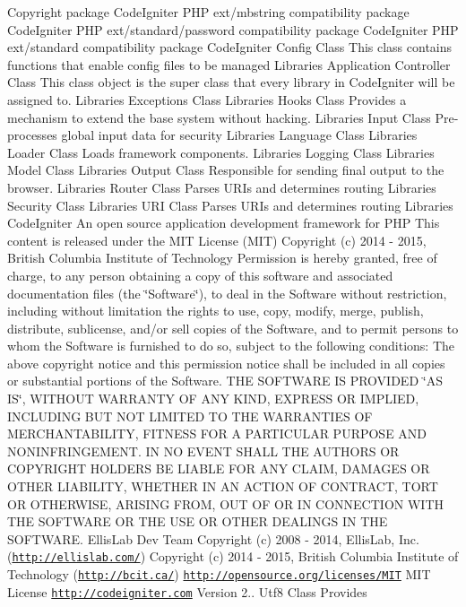 \begin{DoxyCopyright}{Copyright}
package  Code\+Igniter P\+H\+P ext/mbstring compatibility package  Code\+Igniter P\+H\+P ext/standard/password compatibility package  Code\+Igniter P\+H\+P ext/standard compatibility package  Code\+Igniter Config Class This class contains functions that enable config files to be managed  Libraries Application Controller Class This class object is the super class that every library in Code\+Igniter will be assigned to.  Libraries Exceptions Class  Libraries Hooks Class Provides a mechanism to extend the base system without hacking.  Libraries Input Class Pre-\/processes global input data for security  Libraries Language Class  Libraries Loader Class Loads framework components.  Libraries Logging Class  Libraries Model Class  Libraries Output Class Responsible for sending final output to the browser.  Libraries Router Class Parses U\+R\+Is and determines routing  Libraries Security Class  Libraries U\+R\+I Class Parses U\+R\+Is and determines routing  Libraries Code\+Igniter An open source application development framework for P\+H\+P This content is released under the M\+I\+T License (M\+I\+T) Copyright (c) 2014 -\/ 2015, British Columbia Institute of Technology Permission is hereby granted, free of charge, to any person obtaining a copy of this software and associated documentation files (the \char`\"{}\+Software\char`\"{}), to deal in the Software without restriction, including without limitation the rights to use, copy, modify, merge, publish, distribute, sublicense, and/or sell copies of the Software, and to permit persons to whom the Software is furnished to do so, subject to the following conditions\+: The above copyright notice and this permission notice shall be included in all copies or substantial portions of the Software. T\+H\+E S\+O\+F\+T\+W\+A\+R\+E I\+S P\+R\+O\+V\+I\+D\+E\+D \char`\"{}\+A\+S I\+S\char`\"{}, W\+I\+T\+H\+O\+U\+T W\+A\+R\+R\+A\+N\+T\+Y O\+F A\+N\+Y K\+I\+N\+D, E\+X\+P\+R\+E\+S\+S O\+R I\+M\+P\+L\+I\+E\+D, I\+N\+C\+L\+U\+D\+I\+N\+G B\+U\+T N\+O\+T L\+I\+M\+I\+T\+E\+D T\+O T\+H\+E W\+A\+R\+R\+A\+N\+T\+I\+E\+S O\+F M\+E\+R\+C\+H\+A\+N\+T\+A\+B\+I\+L\+I\+T\+Y, F\+I\+T\+N\+E\+S\+S F\+O\+R A P\+A\+R\+T\+I\+C\+U\+L\+A\+R P\+U\+R\+P\+O\+S\+E A\+N\+D N\+O\+N\+I\+N\+F\+R\+I\+N\+G\+E\+M\+E\+N\+T. I\+N N\+O E\+V\+E\+N\+T S\+H\+A\+L\+L T\+H\+E A\+U\+T\+H\+O\+R\+S O\+R C\+O\+P\+Y\+R\+I\+G\+H\+T H\+O\+L\+D\+E\+R\+S B\+E L\+I\+A\+B\+L\+E F\+O\+R A\+N\+Y C\+L\+A\+I\+M, D\+A\+M\+A\+G\+E\+S O\+R O\+T\+H\+E\+R L\+I\+A\+B\+I\+L\+I\+T\+Y, W\+H\+E\+T\+H\+E\+R I\+N A\+N A\+C\+T\+I\+O\+N O\+F C\+O\+N\+T\+R\+A\+C\+T, T\+O\+R\+T O\+R O\+T\+H\+E\+R\+W\+I\+S\+E, A\+R\+I\+S\+I\+N\+G F\+R\+O\+M, O\+U\+T O\+F O\+R I\+N C\+O\+N\+N\+E\+C\+T\+I\+O\+N W\+I\+T\+H T\+H\+E S\+O\+F\+T\+W\+A\+R\+E O\+R T\+H\+E U\+S\+E O\+R O\+T\+H\+E\+R D\+E\+A\+L\+I\+N\+G\+S I\+N T\+H\+E S\+O\+F\+T\+W\+A\+R\+E.  Ellis\+Lab Dev Team  Copyright (c) 2008 -\/ 2014, Ellis\+Lab, Inc. (\href{http://ellislab.com/}{\tt http\+://ellislab.\+com/})  Copyright (c) 2014 -\/ 2015, British Columbia Institute of Technology (\href{http://bcit.ca/}{\tt http\+://bcit.\+ca/})  \href{http://opensource.org/licenses/MIT}{\tt http\+://opensource.\+org/licenses/\+M\+I\+T} M\+I\+T License  \href{http://codeigniter.com}{\tt http\+://codeigniter.\+com}  Version 2..  Utf8 Class Provides 
\end{DoxyCopyright}
